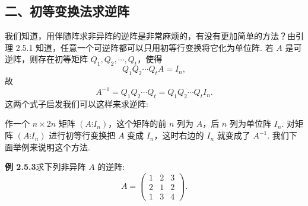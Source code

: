 \documentclass[UTF8, 12pt, fontset=fandol, oneside]{ctexart}
\begin{document}
\subsection*{二、初等变换法求逆阵}

我们知道，用伴随阵求非异阵的逆阵是非常麻烦的，有没有更加简单的方法？由引理 2.5.1 知道，任意一个可逆阵都可以只用初等行变换将它化为单位阵. 若 $A$ 是可逆阵，则存在初等矩阵 $Q_1,Q_2,\cdots,Q_t$，使得
\[
Q_1Q_2\cdots Q_tA=I_n,
\]
故
\[
A^{-1}=Q_1Q_2\cdots Q_t=Q_1Q_2\cdots Q_tI_n.
\]
这两个式子启发我们可以这样来求逆阵:

作一个 $n\times 2n$ 矩阵 $(A\vdots I_n)$，这个矩阵的前 $n$ 列为 $A$，后 $n$ 列为单位阵 $I_n$. 对矩阵 $(A\vdots I_n)$ 进行初等行变换把 $A$ 变成 $I_n$，这时右边的 $I_n$ 就变成了 $A^{-1}$. 我们下面举例来说明这个方法.

\noindent\textbf{例 2.5.3}\quad 求下列非异阵 $A$ 的逆阵:
\[
A=\left(\begin{array}{ccc}
1 & 2 & 3\\
2 & 1 & 2\\
1 & 3 & 4
\end{array}\right).
\]
\end{document}
